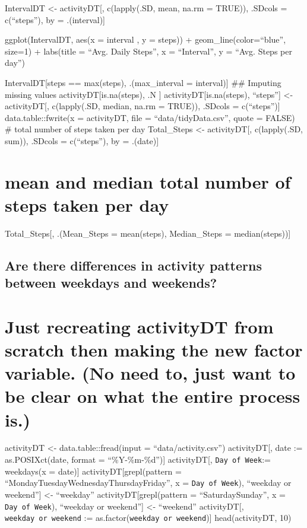 \documentclass[]{article}
\begin{document}
IntervalDT \textless{}- activityDT{[}, c(lapply(.SD, mean, na.rm =
TRUE)), .SDcols = c(``steps''), by = .(interval){]}

ggplot(IntervalDT, aes(x = interval , y = steps)) +
geom\_line(color=``blue'', size=1) + labs(title = ``Avg. Daily Steps'',
x = ``Interval'', y = ``Avg. Steps per day'')

IntervalDT{[}steps == max(steps), .(max\_interval = interval){]} \#\#
Imputing missing values activityDT{[}is.na(steps), .N {]}
activityDT{[}is.na(steps), ``steps''{]} \textless{}- activityDT{[},
c(lapply(.SD, median, na.rm = TRUE)), .SDcols = c(``steps''){]}
data.table::fwrite(x = activityDT, file = ``data/tidyData.csv'', quote =
FALSE) \# total number of steps taken per day Total\_Steps \textless{}-
activityDT{[}, c(lapply(.SD, sum)), .SDcols = c(``steps''), by =
.(date){]}

\hypertarget{mean-and-median-total-number-of-steps-taken-per-day}{%
\section{mean and median total number of steps taken per
day}\label{mean-and-median-total-number-of-steps-taken-per-day}}

Total\_Steps{[}, .(Mean\_Steps = mean(steps), Median\_Steps =
median(steps)){]}

\hypertarget{are-there-differences-in-activity-patterns-between-weekdays-and-weekends}{%
\subsection{Are there differences in activity patterns between weekdays
and
weekends?}\label{are-there-differences-in-activity-patterns-between-weekdays-and-weekends}}

\hypertarget{just-recreating-activitydt-from-scratch-then-making-the-new-factor-variable.-no-need-to-just-want-to-be-clear-on-what-the-entire-process-is.}{%
\section{Just recreating activityDT from scratch then making the new
factor variable. (No need to, just want to be clear on what the entire
process
is.)}\label{just-recreating-activitydt-from-scratch-then-making-the-new-factor-variable.-no-need-to-just-want-to-be-clear-on-what-the-entire-process-is.}}

activityDT \textless{}- data.table::fread(input = ``data/activity.csv'')
activityDT{[}, date := as.POSIXct(date, format = ``\%Y-\%m-\%d''){]}
activityDT{[}, \texttt{Day\ of\ Week}:= weekdays(x = date){]}
activityDT{[}grepl(pattern =
``Monday\textbar{}Tuesday\textbar{}Wednesday\textbar{}Thursday\textbar{}Friday'',
x = \texttt{Day\ of\ Week}), ``weekday or weekend''{]} \textless{}-
``weekday'' activityDT{[}grepl(pattern = ``Saturday\textbar{}Sunday'', x
= \texttt{Day\ of\ Week}), ``weekday or weekend''{]} \textless{}-
``weekend'' activityDT{[}, \texttt{weekday\ or\ weekend} :=
as.factor(\texttt{weekday\ or\ weekend}){]} head(activityDT, 10)
\end{document}
